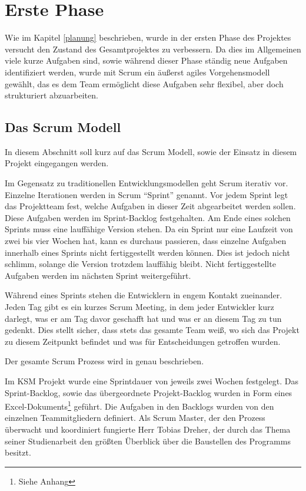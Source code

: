 \section{Erste Phase}

Wie im Kapitel \ref{planung} beschrieben, wurde in der ersten Phase des Projektes versucht den Zustand des Gesamtprojektes zu verbessern. Da dies im Allgemeinen viele kurze Aufgaben sind, sowie während dieser Phase ständig neue Aufgaben identifiziert werden, wurde mit Scrum ein äußerst agiles Vorgehensmodell gewählt, das es dem Team ermöglicht diese Aufgaben sehr flexibel, aber doch strukturiert abzuarbeiten.

\subsection{Das Scrum Modell}

In diesem Abschnitt soll kurz auf das Scrum Modell, sowie der Einsatz in diesem Projekt eingegangen werden.

Im Gegensatz zu traditionellen Entwicklungsmodellen geht Scrum iterativ vor. Einzelne Iterationen werden in Scrum ``Sprint'' genannt. Vor jedem Sprint legt das Projektteam fest, welche Aufgaben in dieser Zeit abgearbeitet werden sollen. Diese Aufgaben werden im Sprint-Backlog festgehalten. Am Ende eines solchen Sprints muss eine lauffähige Version stehen. Da ein Sprint nur eine Laufzeit von zwei bis vier Wochen hat, kann es durchaus passieren, dass einzelne Aufgaben innerhalb eines Sprints nicht fertiggestellt werden können. Dies ist jedoch nicht schlimm, solange die Version trotzdem lauffähig bleibt. Nicht fertiggestellte Aufgaben werden im nächsten Sprint  weitergeführt. 

Während eines Sprints stehen die Entwicklern in engem Kontakt zueinander. Jeden Tag gibt es ein kurzes Scrum Meeting, in dem jeder Entwickler kurz darlegt, was er am Tag davor geschafft hat und was er an diesem Tag zu tun gedenkt. Dies stellt sicher, dass stets das gesamte Team weiß, wo sich das Projekt zu diesem Zeitpunkt befindet und was für Entscheidungen getroffen wurden. 

Der gesamte Scrum Prozess wird in \cite{bib:agil} genau beschrieben.

Im KSM Projekt wurde eine Sprintdauer von jeweils zwei Wochen festgelegt. Das Sprint-Backlog, sowie das übergeordnete Projekt-Backlog wurden in Form eines Excel-Dokuments\footnote{Siehe Anhang} geführt. Die Aufgaben in den Backlogs wurden von den einzelnen Teammitgliedern definiert. Als Scrum Master, der den Prozess überwacht und koordiniert fungierte Herr Tobias Dreher, der durch das Thema seiner Studienarbeit den größten Überblick über die Baustellen des Programms besitzt.

